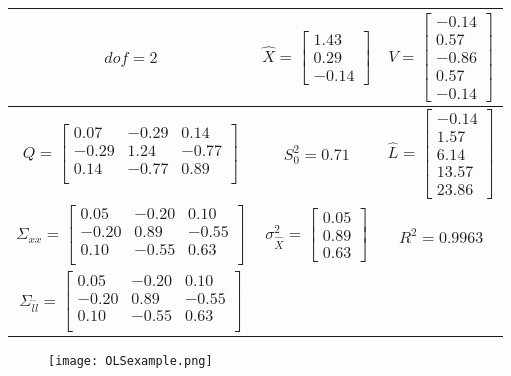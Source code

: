 \begin{table}[htbp]
	\centering
	\begin{tabular}{|c|c|c|}
		\toprule
		$dof = 2$
		&
		$\hat{X} = 
		\begin{bmatrix}
		1.43\\0.29\\-0.14
		\end{bmatrix}$
		&
		$V = 
		\begin{bmatrix}
		-0.14\\0.57\\-0.86\\0.57\\-0.14
		\end{bmatrix}$
		\\	\midrule
		$Q = \begin{bmatrix}
		0.07 & -0.29 & 0.14 \\ 
		-0.29 & 1.24 & -0.77 \\ 
		0.14 & -0.77 & 0.89 \\ 
		\end{bmatrix}$
		&
		$S_0^2 = 0.71$
		&
		$\hat{L} = 
		\begin{bmatrix}
		-0.14\\1.57\\6.14\\13.57\\23.86
		\end{bmatrix}$
		\\	\midrule
		$\Sigma_{xx} = \begin{bmatrix}
		0.05 & -0.20 & 0.10 \\ 
		-0.20 & 0.89 & -0.55 \\ 
		0.10 & -0.55 & 0.63 \\ 
		\end{bmatrix}$
		&
		$\sigma_{\hat{X}}^2 = 
		\begin{bmatrix}
		0.05\\0.89\\0.63 
		\end{bmatrix}$
		&
		$R^2 = 0.9963$
		\\ \midrule
		$\Sigma_{\hat{l}\hat{l}} = \begin{bmatrix}
		0.05 & -0.20 & 0.10 \\ 
		-0.20 & 0.89 & -0.55 \\ 
		0.10 & -0.55 & 0.63 \\ 
		\end{bmatrix}$
		& & \\
		\bottomrule
	\end{tabular}%
\end{table}%
\begin{figure}[H]
	\centering
	\texttt{[image: OLSexample.png]}
\end{figure}
\clearpage

